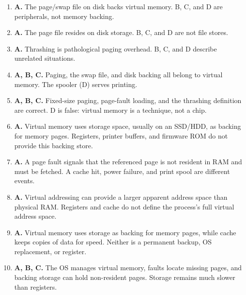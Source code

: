 \begin{enumerate}[label=\textbf{Q\arabic*.}, leftmargin=*]
\item \textbf{A.} The page/swap file on disk backs virtual memory. B, C, and D are peripherals, not memory backing.
\item \textbf{A.} The page file resides on disk storage. B, C, and D are not file stores.
\item \textbf{A.} Thrashing is pathological paging overhead. B, C, and D describe unrelated situations.
\item \textbf{A, B, C.} Paging, the swap file, and disk backing all belong to virtual memory. The spooler (D) serves printing.
\item \textbf{A, B, C.} Fixed-size paging, page-fault loading, and the thrashing definition are correct. D is false: virtual memory is a technique, not a chip.
\item \textbf{A.} Virtual memory uses storage space, usually on an SSD/HDD, as backing for memory pages. Registers, printer buffers, and firmware ROM do not provide this backing store.

\item \textbf{A.} A page fault signals that the referenced page is not resident in RAM and must be fetched. A cache hit, power failure, and print spool are different events.

\item \textbf{A.} Virtual addressing can provide a larger apparent address space than physical RAM. Registers and cache do not define the process's full virtual address space.

\item \textbf{A.} Virtual memory uses storage as backing for memory pages, while cache keeps copies of data for speed. Neither is a permanent backup, OS replacement, or register.

\item \textbf{A, B, C.} The OS manages virtual memory, faults locate missing pages, and backing storage can hold non-resident pages. Storage remains much slower than registers.

\end{enumerate}
